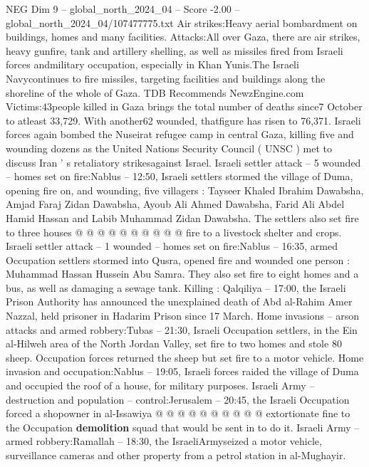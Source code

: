 \begin{textsample}{NEG Dim 9 – global\_north\_2024\_04 – Score -2.00 – global\_north\_2024\_04/107477775.txt}  \label{ex:f9_neg_218}
Air strikes:Heavy aerial bombardment on buildings, homes and many facilities.
Attacks:All over Gaza, there are air strikes, heavy gunfire, tank and artillery shelling, as well as missiles fired from Israeli forces andmilitary occupation, especially in Khan Yunis.The Israeli Navycontinues to fire missiles, targeting facilities and buildings along the shoreline of the whole of Gaza.
TDB Recommends NewzEngine.com Victims:43people killed in Gaza brings the total number of deaths since7 October to atleast 33,729.
With another62 wounded, thatfigure has risen to 76,371.
Israeli forces again bombed the Nuseirat refugee camp in central Gaza, killing five and wounding dozens as the United Nations Security Council ( UNSC ) met to discuss Iran ' s retaliatory strikesagainst Israel.
Israeli settler attack -- 5 wounded -- homes set on fire:Nablus -- 12:50, Israeli settlers stormed the village of Duma, opening fire on, and wounding, five villagers : Tayseer Khaled Ibrahim Dawabsha, Amjad Faraj Zidan Dawabsha, Ayoub Ali Ahmed Dawabsha, Farid Ali Abdel Hamid Hassan and Labib Muhammad Zidan Dawabsha.
The settlers also set fire to three houses @ @ @ @ @ @ @ @ @ @ fire to a livestock shelter and crops.
Israeli settler attack -- 1 wounded -- homes set on fire:Nablus -- 16:35, armed Occupation settlers stormed into Qusra, opened fire and wounded one person : Muhammad Hassan Hussein Abu Samra.
They also set fire to eight homes and a bus, as well as damaging a sewage tank.
Killing : Qalqiliya -- 17:00, the Israeli Prison Authority has announced the unexplained death of Abd al-Rahim Amer Nazzal, held prisoner in Hadarim Prison since 17 March.
Home invasions -- arson attacks and armed robbery:Tubas -- 21:30, Israeli Occupation settlers, in the Ein al-Hilweh area of the North Jordan Valley, set fire to two homes and stole 80 sheep.
Occupation forces returned the sheep but set fire to a motor vehicle.
Home invasion and occupation:Nablus -- 19:05, Israeli forces raided the village of Duma and occupied the roof of a house, for military purposes.
Israeli Army -- destruction and population -- control:Jerusalem -- 20:45, the Israeli Occupation forced a shopowner in al-Issawiya @ @ @ @ @ @ @ @ @ @ extortionate fine to the Occupation \textbf{demolition} squad that would be sent in to do it.
Israeli Army -- armed robbery:Ramallah -- 18:30, the IsraeliArmyseized a motor vehicle, surveillance cameras and other property from a petrol station in al-Mughayir.

\end{textsample}
